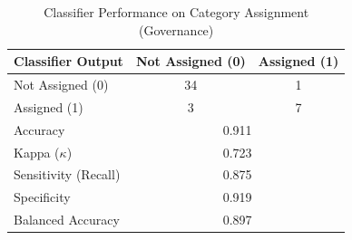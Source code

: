 \begin{table}[h!]
\begin{minipage}{0.48\textwidth}
\centering
\caption{Classifier Performance on Category Assignment (Governance)}
\label{tab:cm-governance}
\begin{tabular}{lcc}
\hline
\textbf{Classifier Output} & \textbf{Not Assigned (0)} & \textbf{Assigned (1)} \\
\hline
Not Assigned (0) & 34 & 1 \\
Assigned (1) & 3 & 7 \\
\hline
Accuracy & \multicolumn{2}{c}{0.911} \\
Kappa ($\kappa$) & \multicolumn{2}{c}{0.723} \\
Sensitivity (Recall) & \multicolumn{2}{c}{0.875} \\
Specificity & \multicolumn{2}{c}{0.919} \\
Balanced Accuracy & \multicolumn{2}{c}{0.897} \\
\hline
\end{tabular}
\end{minipage}
\end{table}

